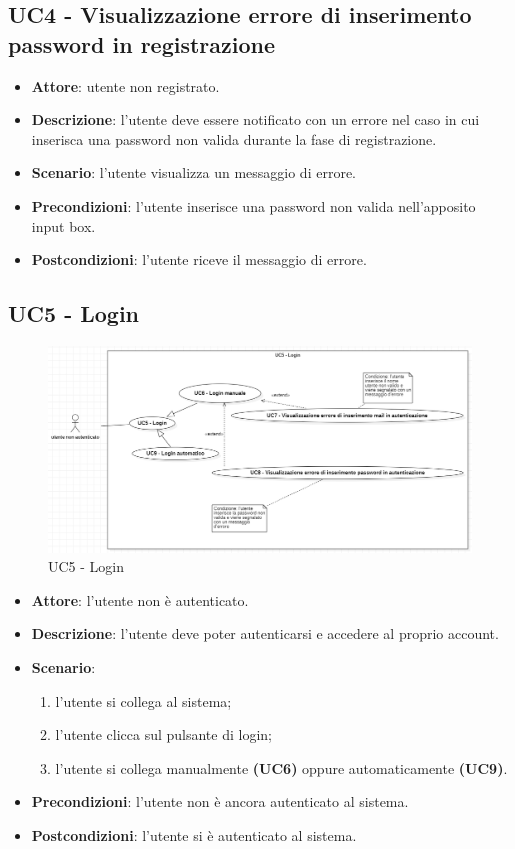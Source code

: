 \subsection{UC4 - Visualizzazione errore di inserimento password in registrazione}
\begin{itemize}
    \item \textbf{Attore}: utente non registrato.
    \item \textbf{Descrizione}: l'utente deve essere notificato con un errore nel caso in cui inserisca una password non valida durante la fase di registrazione.
    \item \textbf{Scenario}: l'utente visualizza un messaggio di errore.
    \item \textbf{Precondizioni}: l'utente inserisce una password non valida nell'apposito input box.
    \item \textbf{Postcondizioni}: l'utente riceve il messaggio di errore.
\end{itemize}

\subsection{UC5 - Login}
\begin{figure}[!h]
    \includegraphics[width=15cm]{sezioni/Images/UC5-log.png}
    \centering
    \caption{UC5 - Login}
\end{figure}
\begin{itemize}
    \item \textbf{Attore}: l'utente non è autenticato.
    \item \textbf{Descrizione}: l'utente deve poter autenticarsi e accedere al proprio account.
    \item \textbf{Scenario}:
    \begin{enumerate}
        \item l'utente si collega al sistema;
        \item l'utente clicca sul pulsante di login;
        \item l'utente si collega manualmente \textbf{(UC6)} oppure automaticamente \textbf{(UC9)}.
    \end{enumerate}
    \item \textbf{Precondizioni}: l'utente non è ancora autenticato al sistema.
    \item \textbf{Postcondizioni}: l'utente si è autenticato al sistema.
\end{itemize}

